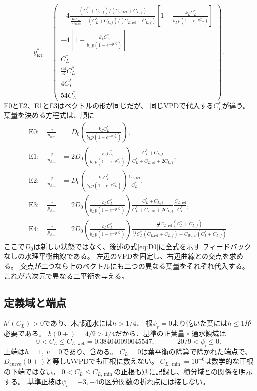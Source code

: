 \documentclass[a4paper,11pt]{ltjsarticle}
\begin{document}
\begin{equation}\label{eq:explicit4}
y^*_{\mathrm{E4}}=
\begin{pmatrix}
-4\frac{(C_L^*+C_{L,f})/(C_{L,\mathrm{ref}}+C_{L,f})}
 {\frac{64C_L^*}{3C_{W,\mathrm{ref}}}
  +(C_L^*+C_{L,f})/(C_{L,\mathrm{ref}}+C_{L,f})}
 [1-\frac{k_LC_L^*}{b_Lp(1-e^{-qC_L^*})}]\\
-4[1-\frac{k_LC_L^*}{b_Lp(1-e^{-qC_L^*})}]\\
C_L^*\\ \frac{64}{3}C_L^*\\4C_L^*\\54C_L^*
\end{pmatrix}.
\end{equation}
E0とE2、E1とE3はベクトルの形が同じだが、
同じVPDで代入する$C_L^*$が違う。葉量を決める方程式は、順に
\begin{align}
\mathrm{E0}:\quad \frac{v}{p_{\mathrm{atm}}}
 &=D_0\!\left(\frac{k_LC_L^*}{b_Lp(1-e^{-qC_L^*})}\right),\\
\mathrm{E1}:\quad \frac{v}{p_{\mathrm{atm}}}
 &=2D_0\!\left(\frac{k_LC_L^*}{b_Lp(1-e^{-qC_L^*})}\right)
 \frac{C_L^*+C_{L,f}}{C_L^*+C_{L,\mathrm{ref}}+2C_{L,f}},\\
\mathrm{E2}:\quad \frac{v}{p_{\mathrm{atm}}}
 &=D_0\!\left(\frac{k_LC_L^*}{b_Lp(1-e^{-qC_L^*})}\right)
 \frac{C_{L,\mathrm{ref}}}{C_L^*},\label{eq:scalar2}\\
\mathrm{E3}:\quad \frac{v}{p_{\mathrm{atm}}}
 &=2D_0\!\left(\frac{k_LC_L^*}{b_Lp(1-e^{-qC_L^*})}\right)
 \frac{C_L^*+C_{L,f}}{C_L^*+C_{L,\mathrm{ref}}+2C_{L,f}}
 \frac{C_{L,\mathrm{ref}}}{C_L^*},\label{eq:scalar3}\\
\mathrm{E4}:\quad \frac{v}{p_{\mathrm{atm}}}
 &=2D_0\!\left(\frac{k_LC_L^*}{b_Lp(1-e^{-qC_L^*})}\right)
 \frac{\frac{64}{3}C_{L,\mathrm{ref}}(C_L^*+C_{L,f})}
 {\frac{64}{3}C_L^*(C_{L,\mathrm{ref}}+C_{L,f})
    +C_{W,\mathrm{ref}}(C_L^*+C_{L,f})}.\label{eq:scalar4expanded}
\end{align}
ここで$D_0$は新しい状態ではなく、後述の式\eqref{eq:D0}に全式を示す
フィードバックなしの水理平衡曲線である。
左辺のVPDを固定し、右辺曲線との交点を求める。
交点が二つなら上のベクトルにも二つの異なる葉量をそれぞれ代入する。
これが六次元で異なる二平衡を与える。

\subsection{定義域と端点}
$h'(C_L)>0$であり、木部通水には$h>1/4$、
根$\psi_r=0$より乾いた葉には$h\le1$が必要である。
$h(0+)=4/9>1/4$だから、基準の正葉量・通水領域は
\begin{equation}\label{eq:domain}
 0<C_L\le C_{L,\mathrm{wet}}=0.384040090045547,\qquad
 -20/9<\psi_l\le0 .
\end{equation}
上端は$h=1,\ v=0$であり、含める。
$C_L=0$は葉平衡の除算で除かれた端点で、$D_{\mathrm{curve}}(0+)$と等しいVPDでも正根に数えない。
$C_{L,\min}=10^{-6}$は数学的な正根の下端ではない。
$0<C_L\le C_{L,\min}$の正根も別に記録し、積分域との関係を明示する。
基準正枝は$\psi_l=-3,-4$の区分関数の折れ点には接しない。
\end{document}
